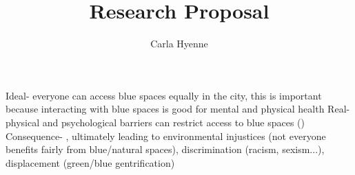 \documentclass{article}
\title{Research Proposal}
\author{Carla Hyenne}
\date{}
\begin{document}
\maketitle






Ideal- everyone can access blue spaces equally in the city, this is important because interacting with blue spaces is good for mental and physical health 
Real- physical and psychological barriers can restrict access to blue spaces ()
Consequence- , ultimately leading to environmental injustices (not everyone benefits fairly from blue/natural spaces), discrimination (racism, sexism...), displacement (green/blue gentrification)




\printbibliography
\end{document}
